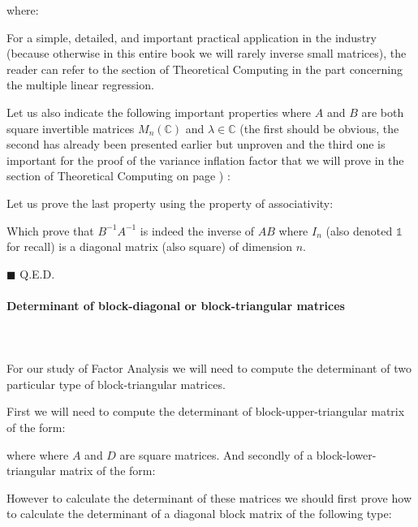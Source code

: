 	\begin{tcolorbox}[colframe=black,colback=white,sharp corners]
	where:
	
	\end{tcolorbox}
	
	For a simple, detailed, and important practical application in the industry (because otherwise in this entire book we will rarely inverse small matrices), the reader can refer to the section of Theoretical Computing in the part concerning the multiple linear regression.
	
	Let us also indicate the following important properties where $A$ and $B$ are both square invertible matrices $M_{n}(\mathbb{C})$ and $\lambda\in\mathbb{C}$ (the first should be obvious, the second has already been presented earlier but unproven and the third one is important for the proof of the variance inflation factor that we will prove in the section of Theoretical Computing on page \pageref{variance inflation factor}) :
	
	Let us prove the last property using the property of associativity:
	\begin{dem}
	
	Which prove that $B^{-1}A^{-1}$ is indeed the inverse of $AB$ where $I_n$ (also denoted $\mathds{1}$ for recall) is a diagonal matrix (also square) of dimension $n$.
	\begin{flushright}
		$\blacksquare$  Q.E.D.
	\end{flushright}
	\end{dem}
	
	\paragraph{Determinant of block-diagonal or block-triangular matrices}\label{determinant of block-diagonal or block-triangular matrices}\mbox{}\\\\
	For our study of Factor Analysis we will need to compute the determinant of two particular type of block-triangular matrices.
	
	First we will need to compute the determinant of block-upper-triangular matrix of the form:
	
	where where $A$ and $D$ are square matrices. And secondly of a block-lower-triangular matrix of the form:
	
	
	However to calculate the determinant of these matrices we should first prove how to calculate the determinant of a diagonal block matrix of the following type:
	
